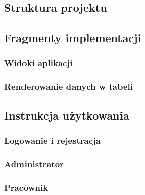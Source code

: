 \subsection{Struktura projektu}


\subsection{Fragmenty implementacji}
\subsubsection{Widoki aplikacji}
\subsubsection{Renderowanie danych w tabeli}

\subsection{Instrukcja użytkowania}
\subsubsection{Logowanie i rejestracja}

\subsubsection{Administrator}
\subsubsection{Pracownik}



